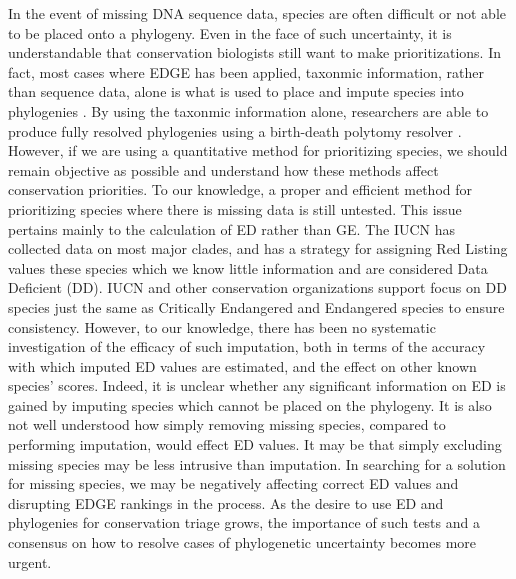 \documentclass[12pt,english]{article}
\begin{document}
In the event of missing DNA sequence data, species are often difficult or not
able to be placed onto a phylogeny. Even in the face of such uncertainty, it is
understandable that conservation biologists still want to make prioritizations.
In fact, most cases where EDGE has been applied, taxonmic information, rather
than sequence data, alone is what is used to place and impute species into
phylogenies \autocite{Isaac2007, Isaac2012, Jetz2014, Curnick2015, Stein2018}.
By using the taxonmic information alone, researchers are able to produce fully
resolved phylogenies using a birth-death polytomy resolver \autocite{Kuhn2011}.
However, if we are using a quantitative method for prioritizing species, we
should remain objective as possible and understand how these methods affect
conservation priorities. To our knowledge, a proper and efficient method for
prioritizing species where there is missing data is still untested. This issue
pertains mainly to the calculation of ED rather than GE. The IUCN has collected
data on most major clades, and has a strategy for assigning Red Listing values
these species which we know little information and are considered Data Deficient
(DD). IUCN and other conservation organizations support focus on DD species just
the same as Critically Endangered and Endangered species to ensure
consistency\autocite{Rodrigues2006}. However, to our knowledge, there has been
no systematic investigation of the efficacy of such imputation, both in terms of
the accuracy with which imputed ED values are estimated, and the effect on other
known species' scores. Indeed, it is unclear whether any significant information
on ED is gained by imputing species which cannot be placed on the phylogeny. It
is also not well understood how simply removing missing species, compared to
performing imputation, would effect ED values. It may be that simply excluding
missing species may be less intrusive than imputation. In searching for a
solution for missing species, we may be negatively affecting correct ED values
and disrupting EDGE rankings in the process. As the desire to use ED and
phylogenies for conservation triage grows, the importance of such tests and a
consensus on how to resolve cases of phylogenetic uncertainty becomes more
urgent.
\end{document}

